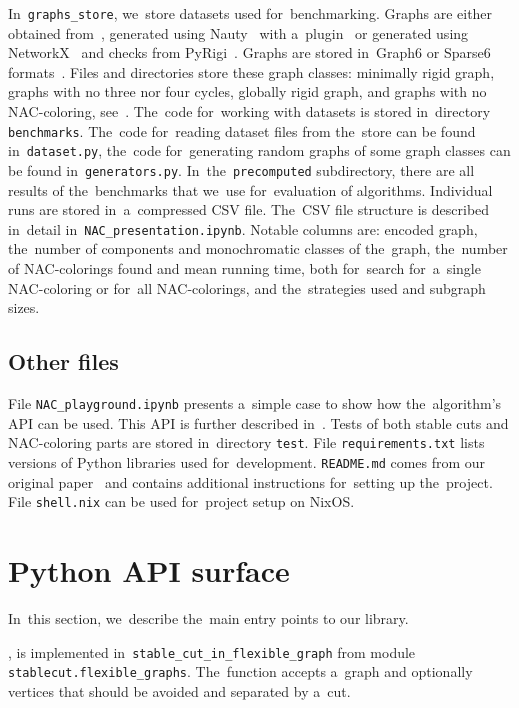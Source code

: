 In~\texttt{graphs\_store}, we~store datasets used for~benchmarking.
Graphs are either obtained from~\cite{extremal_graphs},
generated using Nauty~\cite{nauty} with a~plugin~\cite{nauty_plugin}
or generated using NetworkX~\cite{networkx} and checks from PyRigi~\cite{pyrigi}.
Graphs are stored in~Graph6 or Sparse6 formats~\cite{graph6}.
%
Files and directories store these graph classes:
minimally rigid graph, graphs with no three nor four cycles, globally rigid graph,
and graphs with no NAC-coloring, see~.
%
The~code for~working with datasets is stored in~directory \texttt{benchmarks}.
The~code for~reading dataset files from the~store can be found in~\texttt{dataset.py},
the~code for~generating random graphs of some graph classes
can be found in~\texttt{generators.py}.
%
In~the~\texttt{precomputed} subdirectory, there are all results of the~benchmarks that
we~use for~evaluation of algorithms.
Individual runs are stored in~a~compressed CSV file.
The~CSV file structure is described in~detail in~\texttt{NAC\_presentation.ipynb}.
Notable columns are:
encoded graph,
the~number of \trcon{} components and monochromatic classes of the~graph,
the~number of NAC-colorings found and mean running time,
both for~search for~a~single NAC-coloring or for~all NAC-colorings,
and the~strategies used and subgraph sizes.


\subsection{Other files}

File \texttt{NAC\_playground.ipynb} presents a~simple case
to show how the~algorithm's API can be used.
This API is further described in~.
%
Tests of both stable cuts and NAC-coloring parts are stored in~directory \texttt{test}.
%
File \texttt{requirements.txt} lists versions of Python libraries used for~development.
\texttt{README.md} comes from our original paper~\cite{my_paper}
and contains additional instructions for~setting up the~project.
File \texttt{shell.nix} can be used for~project setup on NixOS\@.


\section{Python API surface}%
\label{sec:impl_python_api}

In~this section,
we~describe the~main entry points to our library.

,
is implemented in~\texttt{stable\_cut\_in\_flexible\_graph}
from module \texttt{stablecut.flexible\_graphs}.
The~function accepts a~graph and
optionally vertices that should be avoided and separated by a~cut.

